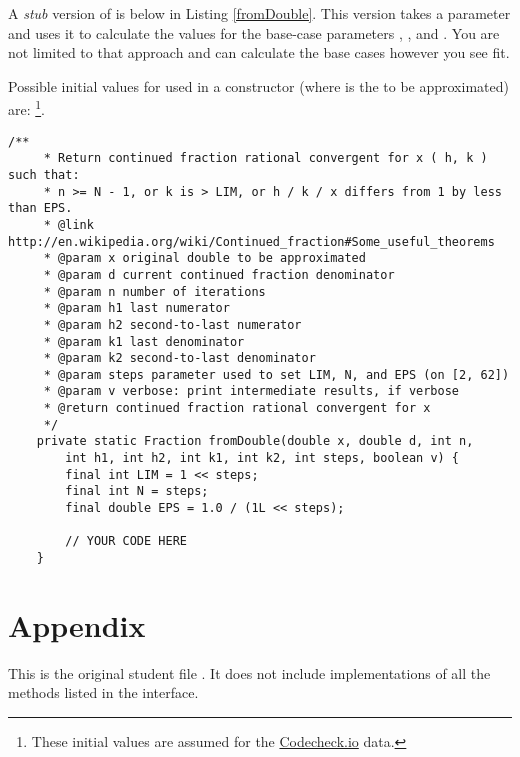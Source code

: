 \documentclass[11pt]{article}%
\begin{document}
A {\em stub} version of  is below in Listing \ref{fromDouble}. This version takes a parameter  and uses it to calculate the values for the base-case parameters , , and . You are not limited to that approach and can calculate the base cases however you see fit.

Possible initial values for  used in a  constructor (where  is the  to be approximated) are: \footnote{These initial values are assumed for the \href{https://codecheck.io/files/2301021526c10hc6gpjmpim58br3mnbmk0v}{Codecheck.io}  data.}.

\begin{lstlisting}[caption=\code{fromDouble} method,label=fromDouble]
    /**
     * Return continued fraction rational convergent for x ( h, k ) such that:
     * n >= N - 1, or k is > LIM, or h / k / x differs from 1 by less than EPS.
     * @link http://en.wikipedia.org/wiki/Continued_fraction#Some_useful_theorems
     * @param x original double to be approximated
     * @param d current continued fraction denominator
     * @param n number of iterations
     * @param h1 last numerator
     * @param h2 second-to-last numerator
     * @param k1 last denominator
     * @param k2 second-to-last denominator
     * @param steps parameter used to set LIM, N, and EPS (on [2, 62])
     * @param v verbose: print intermediate results, if verbose
     * @return continued fraction rational convergent for x
     */
    private static Fraction fromDouble(double x, double d, int n,
        int h1, int h2, int k1, int k2, int steps, boolean v) {
        final int LIM = 1 << steps;
        final int N = steps;
        final double EPS = 1.0 / (1L << steps);

        // YOUR CODE HERE
    }
\end{lstlisting}

\section*{Appendix}

This is the original student file . It does not include implementations of all the methods listed in the  interface. \\
\end{document}
